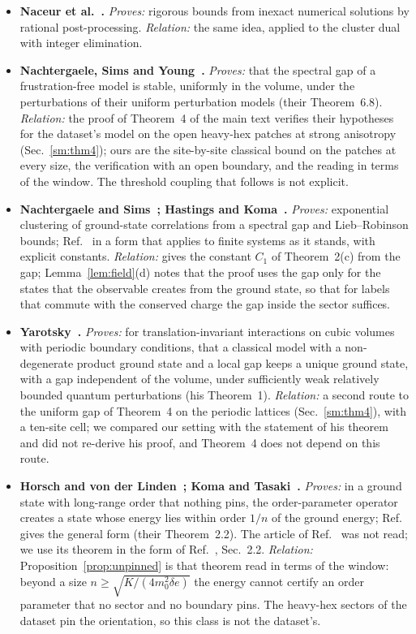 \documentclass[aps,prx,onecolumn,10pt,nofootinbib,longbibliography,floatfix]{revtex4-2}
\theoremstyle{remark}
\newcommand{\de}{\delta e}
\begin{document}
\begin{itemize}
\item \textbf{Naceur et al.~\cite{naceur2025}.} \emph{Proves:} rigorous bounds from inexact numerical solutions by rational post-processing. \emph{Relation:} the same idea, applied to the cluster dual with integer elimination. %
\item \textbf{Nachtergaele, Sims and Young~\cite{nsy2022}.} \emph{Proves:} that the spectral gap of a frustration-free model is stable, uniformly in the volume, under the perturbations of their uniform perturbation models (their Theorem~6.8). \emph{Relation:} the proof of Theorem~4 of the main text verifies their hypotheses for the dataset's model on the open heavy-hex patches at strong anisotropy (Sec.~\ref{sm:thm4}); ours are the site-by-site classical bound on the patches at every size, the verification with an open boundary, and the reading in terms of the window. The threshold coupling that follows is not explicit. %
\item \textbf{Nachtergaele and Sims~\cite{nachtergaele2006}; Hastings and Koma~\cite{hastings2006}.} \emph{Proves:} exponential clustering of ground-state correlations from a spectral gap and Lieb--Robinson bounds; Ref.~\cite{nachtergaele2006} in a form that applies to finite systems as it stands, with explicit constants. \emph{Relation:} gives the constant $C_1$ of Theorem~2(c) from the gap; Lemma~\ref{lem:field}(d) notes that the proof uses the gap only for the states that the observable creates from the ground state, so that for labels that commute with the conserved charge the gap inside the sector suffices. %
\item \textbf{Yarotsky~\cite{yarotsky2006}.} \emph{Proves:} for translation-invariant interactions on cubic volumes with periodic boundary conditions, that a classical model with a non-degenerate product ground state and a local gap keeps a unique ground state, with a gap independent of the volume, under sufficiently weak relatively bounded quantum perturbations (his Theorem~1). \emph{Relation:} a second route to the uniform gap of Theorem~4 on the periodic lattices (Sec.~\ref{sm:thm4}), with a ten-site cell; we compared our setting with the statement of his theorem and did not re-derive his proof, and Theorem~4 does not depend on this route. %
\item \textbf{Horsch and von der Linden~\cite{horsch1988}; Koma and Tasaki~\cite{koma1994}.} \emph{Proves:} in a ground state with long-range order that nothing pins, the order-parameter operator creates a state whose energy lies within order $1/n$ of the ground energy; Ref.~\cite{koma1994} gives the general form (their Theorem~2.2). The article of Ref.~\cite{horsch1988} was not read; we use its theorem in the form of Ref.~\cite{koma1994}, Sec.~2.2. \emph{Relation:} Proposition~\ref{prop:unpinned} is that theorem read in terms of the window: beyond a size $n\ge\sqrt{K/(4m_0^2\de)}$ the energy cannot certify an order parameter that no sector and no boundary pins. The heavy-hex sectors of the dataset pin the orientation, so this class is not the dataset's. %

\end{itemize}
\end{document}
